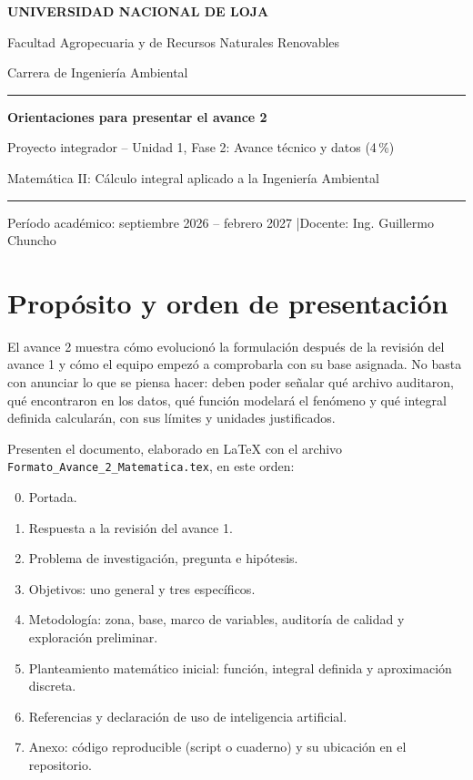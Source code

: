 \documentclass[11pt,a4paper]{article}
\begin{document}
\begin{center}
{\large\bfseries UNIVERSIDAD NACIONAL DE LOJA\par}
{Facultad Agropecuaria y de Recursos Naturales Renovables\par}
{Carrera de Ingeniería Ambiental\par}
\vspace{0.6cm}
{\color{unl}\rule{0.85\linewidth}{1.2pt}\par}
\vspace{0.25cm}
{\LARGE\bfseries Orientaciones para presentar el avance 2\par}
\vspace{0.15cm}
{\large Proyecto integrador -- Unidad 1, Fase 2: Avance técnico y datos (4\,\%)\par}
{\large Matemática II: Cálculo integral aplicado a la Ingeniería Ambiental\par}
\vspace{0.15cm}
{\color{unl}\rule{0.85\linewidth}{1.2pt}\par}
\vspace{0.1cm}
{Período académico: septiembre 2026 -- febrero 2027 \quad|\quad Docente: Ing. Guillermo Chuncho\par}
\end{center}

\section*{Propósito y orden de presentación}

El avance 2 muestra cómo evolucionó la formulación después de la revisión del avance 1 y cómo el equipo empezó a comprobarla con su base asignada. No basta con anunciar lo que se piensa hacer: deben poder señalar qué archivo auditaron, qué encontraron en los datos, qué función modelará el fenómeno y qué integral definida calcularán, con sus límites y unidades justificados.

Presenten el documento, elaborado en \LaTeX{} con el archivo \texttt{Formato\_Avance\_2\_Matematica.tex}, en este orden:
\begin{enumerate}[label=\arabic*.]
  \setcounter{enumi}{-1}
  \item Portada.
  \item Respuesta a la revisión del avance 1.
  \item Problema de investigación, pregunta e hipótesis.
  \item Objetivos: uno general y tres específicos.
  \item Metodología: zona, base, marco de variables, auditoría de calidad y exploración preliminar.
  \item Planteamiento matemático inicial: función, integral definida y aproximación discreta.
  \item Referencias y declaración de uso de inteligencia artificial.
  \item[] Anexo: código reproducible (script o cuaderno) y su ubicación en el repositorio.
\end{enumerate}
\end{document}
